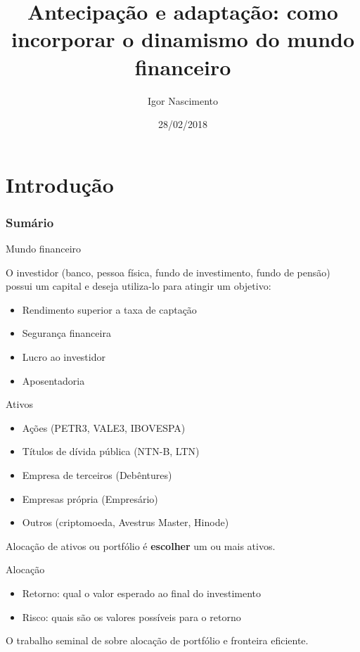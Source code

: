 \documentclass{beamer}
\title[Artigo]{Antecipação e adaptação: como incorporar o dinamismo do mundo financeiro}
\author[Igor Nascimento]{Igor Nascimento}
\institute[LAMFO]{Laboratório de Aprendizado de Máquina em Finanças e Organizações - LAMFO}
\date[2018]{28/02/2018}
\begin{document}
\begin{frame}
  \titlepage
\end{frame}

\section{Introdução}

\begin{frame}
\frametitle{Sumário}
\tableofcontents
\end{frame}




\begin{frame}{Mundo financeiro}

O investidor (banco, pessoa física, fundo de investimento, fundo de pensão) possui um capital e deseja utiliza-lo para atingir um objetivo:

\begin{itemize}
\item Rendimento superior a taxa de captação 
\item Segurança financeira
\item Lucro ao investidor
\item Aposentadoria
\end{itemize}

\end{frame}




\begin{frame}{Ativos}

\begin{itemize}
\item Ações (PETR3, VALE3, IBOVESPA)

\item Títulos de dívida pública (NTN-B, LTN)
\item Empresa de terceiros (Debêntures)
\item Empresas própria (Empresário)
\pause
\item Outros (criptomoeda, Avestrus Master, Hinode)
\end{itemize}

Alocação de ativos ou portfólio é \textbf{escolher} um ou mais ativos.


\end{frame}


\begin{frame}{Alocação}

\begin{itemize}
\item Retorno: qual o valor esperado ao final do investimento
\item Risco:   quais são os valores possíveis para o retorno
\end{itemize}

O trabalho seminal de \cite{mkv} sobre alocação de portfólio e fronteira eficiente.

\end{frame}
\end{document}
